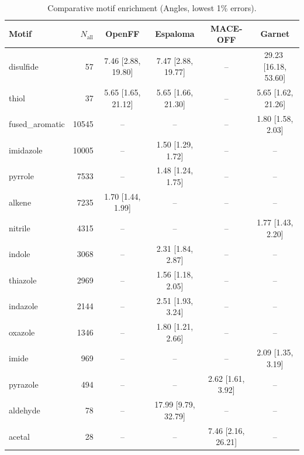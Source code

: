 \begin{table}[h!]
  \centering
  \small
  \setlength{\tabcolsep}{5pt}
  \renewcommand{\arraystretch}{1.15}
  \begin{tabular}{l r c c c c}
    \hline
    Motif & $N_\mathrm{all}$ & OpenFF & Espaloma & MACE-OFF & Garnet \\
    \hline
    disulfide & 57 & 7.46\,\,[2.88, 19.80] & 7.47\,\,[2.88, 19.77] & -- & 29.23\,\,[16.18, 53.60] \\
    thiol & 37 & 5.65\,\,[1.65, 21.12] & 5.65\,\,[1.66, 21.30] & -- & 5.65\,\,[1.62, 21.26] \\
    \hdashline
    fused\_aromatic & 10545 & -- & -- & -- & 1.80\,\,[1.58, 2.03] \\
    imidazole & 10005 & -- & 1.50\,\,[1.29, 1.72] & -- & -- \\
    pyrrole & 7533 & -- & 1.48\,\,[1.24, 1.75] & -- & -- \\
    alkene & 7235 & 1.70\,\,[1.44, 1.99] & -- & -- & -- \\
    nitrile & 4315 & -- & -- & -- & 1.77\,\,[1.43, 2.20] \\
    indole & 3068 & -- & 2.31\,\,[1.84, 2.87] & -- & -- \\
    thiazole & 2969 & -- & 1.56\,\,[1.18, 2.05] & -- & -- \\
    indazole & 2144 & -- & 2.51\,\,[1.93, 3.24] & -- & -- \\
    oxazole & 1346 & -- & 1.80\,\,[1.21, 2.66] & -- & -- \\
    imide & 969 & -- & -- & -- & 2.09\,\,[1.35, 3.19] \\
    pyrazole & 494 & -- & -- & 2.62\,\,[1.61, 3.92] & -- \\
    aldehyde & 78 & -- & 17.99\,\,[9.79, 32.79] & -- & -- \\
    acetal & 28 & -- & -- & 7.46\,\,[2.16, 26.21] & -- \\
    \hline
  \end{tabular}
  \caption{Comparative motif enrichment (Angles, lowest 1\% errors).}
  \label{tab:compare_angles_best}
\end{table}